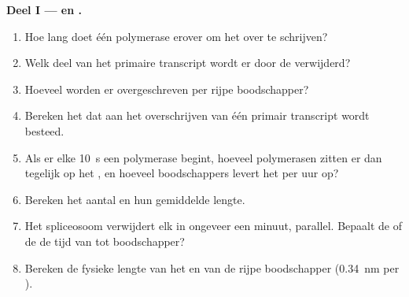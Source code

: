 \begin{problem}
\medskip
\noindent\textbf{Deel I ---  en .}
\begin{enumerate}
  \item Hoe lang doet één polymerase erover om het  over te schrijven?
  \item Welk deel van het primaire transcript wordt er door de 
        verwijderd?
  \item Hoeveel  worden er overgeschreven per  rijpe
        boodschapper?
  \item Bereken het  dat aan het overschrijven van één primair
        transcript wordt besteed.
  \item Als er elke \qty{10}{s} een polymerase begint, hoeveel polymerasen
        zitten er dan tegelijk op het , en hoeveel boodschappers levert
        het  per uur op?
  \item Bereken het aantal  en hun gemiddelde lengte.
  \item Het spliceosoom verwijdert elk  in ongeveer een minuut,
        parallel. Bepaalt de  of de  de tijd van 
        tot boodschapper?
  \item Bereken de fysieke lengte van het  en van de rijpe boodschapper
        (\qty{0.34}{nm} per ).
\end{enumerate}


\end{problem}
